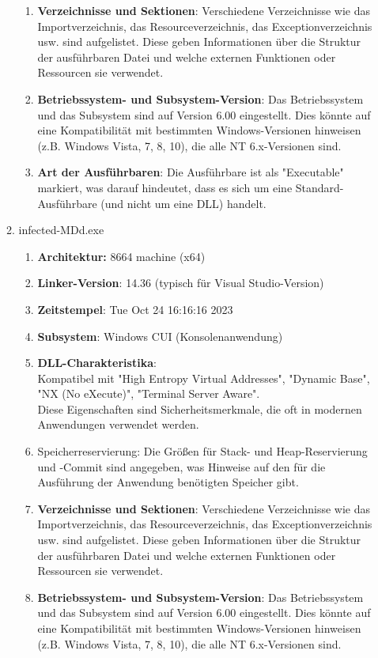 \documentclass{article}
\begin{document}
\begin{enumerate}
\begin{enumerate}
\begin{enumerate}
				\item \textbf{Verzeichnisse und Sektionen}: Verschiedene Verzeichnisse wie das Importverzeichnis, das Resourceverzeichnis, das Exceptionverzeichnis usw. sind aufgelistet. Diese geben Informationen über die Struktur der ausführbaren Datei und welche externen Funktionen oder Ressourcen sie verwendet.
				\item \textbf{Betriebssystem- und Subsystem-Version}: Das Betriebssystem und das Subsystem sind auf Version 6.00 eingestellt. Dies könnte auf eine Kompatibilität mit bestimmten Windows-Versionen hinweisen (z.B. Windows Vista, 7, 8, 10), die alle NT 6.x-Versionen sind.
				\item \textbf{Art der Ausführbaren}: Die Ausführbare ist als "Executable" markiert, was darauf hindeutet, dass es sich um eine Standard-Ausführbare (und nicht um eine DLL) handelt.
			\end{enumerate}
			\item infected-MDd.exe
			\begin{enumerate}
				\item \textbf{Architektur:} 8664 machine (x64)
				\item \textbf{Linker-Version}: 14.36 (typisch für Visual Studio-Version)
				\item \textbf{Zeitstempel}: Tue Oct 24 16:16:16 2023
				\item \textbf{Subsystem}: Windows CUI (Konsolenanwendung)
				\item \textbf{DLL-Charakteristika}:\\
				Kompatibel mit "High Entropy Virtual Addresses", "Dynamic Base", "NX (No eXecute)", "Terminal Server Aware".\\
				Diese Eigenschaften sind Sicherheitsmerkmale, die oft in modernen Anwendungen verwendet werden.
				\item Speicherreservierung: Die Größen für Stack- und Heap-Reservierung und -Commit sind angegeben, was Hinweise auf den für die Ausführung der Anwendung benötigten Speicher gibt.
				\item \textbf{Verzeichnisse und Sektionen}: Verschiedene Verzeichnisse wie das Importverzeichnis, das Resourceverzeichnis, das Exceptionverzeichnis usw. sind aufgelistet. Diese geben Informationen über die Struktur der ausführbaren Datei und welche externen Funktionen oder Ressourcen sie verwendet.
				\item \textbf{Betriebssystem- und Subsystem-Version}: Das Betriebssystem und das Subsystem sind auf Version 6.00 eingestellt. Dies könnte auf eine Kompatibilität mit bestimmten Windows-Versionen hinweisen (z.B. Windows Vista, 7, 8, 10), die alle NT 6.x-Versionen sind.

\end{enumerate}
\end{enumerate}
\end{enumerate}
\end{document}
